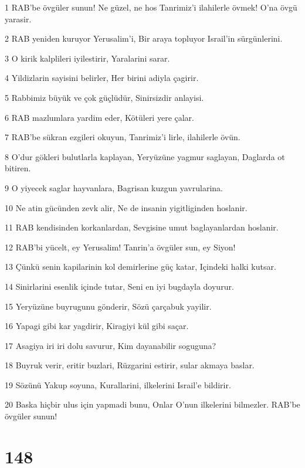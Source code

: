 \par 1 RAB'be övgüler sunun! Ne güzel, ne hos Tanrimiz'i ilahilerle övmek! O'na övgü yarasir.
\par 2 RAB yeniden kuruyor Yerusalim'i, Bir araya topluyor Israil'in sürgünlerini.
\par 3 O kirik kalplileri iyilestirir, Yaralarini sarar.
\par 4 Yildizlarin sayisini belirler, Her birini adiyla çagirir.
\par 5 Rabbimiz büyük ve çok güçlüdür, Sinirsizdir anlayisi.
\par 6 RAB mazlumlara yardim eder, Kötüleri yere çalar.
\par 7 RAB'be sükran ezgileri okuyun, Tanrimiz'i lirle, ilahilerle övün.
\par 8 O'dur gökleri bulutlarla kaplayan, Yeryüzüne yagmur saglayan, Daglarda ot bitiren.
\par 9 O yiyecek saglar hayvanlara, Bagrisan kuzgun yavrularina.
\par 10 Ne atin gücünden zevk alir, Ne de insanin yigitliginden hoslanir.
\par 11 RAB kendisinden korkanlardan, Sevgisine umut baglayanlardan hoslanir.
\par 12 RAB'bi yücelt, ey Yerusalim! Tanrin'a övgüler sun, ey Siyon!
\par 13 Çünkü senin kapilarinin kol demirlerine güç katar, Içindeki halki kutsar.
\par 14 Sinirlarini esenlik içinde tutar, Seni en iyi bugdayla doyurur.
\par 15 Yeryüzüne buyrugunu gönderir, Sözü çarçabuk yayilir.
\par 16 Yapagi gibi kar yagdirir, Kiragiyi kül gibi saçar.
\par 17 Asagiya iri iri dolu savurur, Kim dayanabilir soguguna?
\par 18 Buyruk verir, eritir buzlari, Rüzgarini estirir, sular akmaya baslar.
\par 19 Sözünü Yakup soyuna, Kurallarini, ilkelerini Israil'e bildirir.
\par 20 Baska hiçbir ulus için yapmadi bunu, Onlar O'nun ilkelerini bilmezler. RAB'be övgüler sunun!

\chapter{148}

